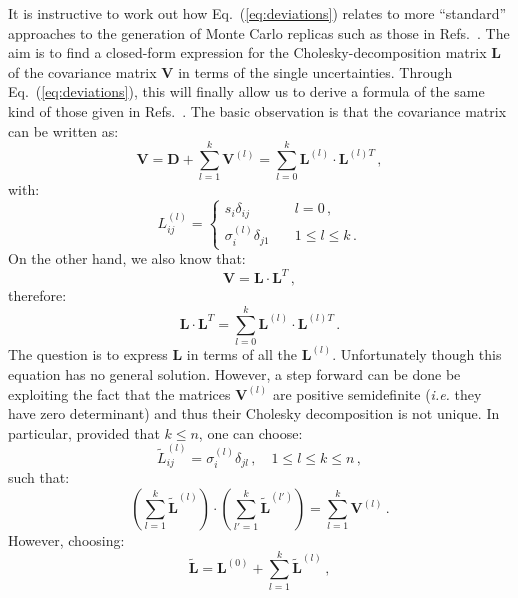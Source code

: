 \documentclass[10pt,a4paper]{article}
\begin{document}
It is instructive to work out how Eq.~(\ref{eq:deviations}) relates to
more ``standard'' approaches to the generation of Monte Carlo replicas
such as those in Refs.~\cite{Ball:2008by, Ball:2014uwa}. The aim is to
find a closed-form expression for the Cholesky-decomposition matrix
$\mathbf{L}$ of the covariance matrix $\mathbf{V}$ in terms of the
single uncertainties. Through Eq.~(\ref{eq:deviations}), this will
finally allow us to derive a formula of the same kind of those given
in Refs.~\cite{Ball:2008by, Ball:2014uwa}. The basic observation is
that the covariance matrix can be written as:
\begin{equation}
\mathbf{V} = \mathbf{D}+ \sum_{l=1}^k 
\mathbf{V}^{(l)} = \sum_{l=0}^k \mathbf{L}^{(l)}\cdot \mathbf{L}^{(l)T}\,,
\end{equation}
with:
\begin{equation}
L_{ij}^{(l)}=\left\{
\begin{array}{ll}
s_i\delta_{ij}&\quad l = 0\,,\\
\sigma_i^{(l)}\delta_{j1}&\quad 1\leq l\leq k\,.
\end{array}
\right.
\end{equation}
On the other hand, we also know that:
\begin{equation}
  \mathbf{V} = \mathbf{L}\cdot \mathbf{L}^T\,,
\end{equation}
therefore:
\begin{equation}
  \mathbf{L}\cdot \mathbf{L}^T=\sum_{l=0}^k \mathbf{L}^{(l)}\cdot \mathbf{L}^{(l)T}\,.
\end{equation}
The question is to express $\mathbf{L}$ in terms of all the
$\mathbf{L}^{(l)}$. Unfortunately though this equation has no general
solution. However, a step forward can be done be exploiting the fact
that the matrices $\mathbf{V}^{(l)}$ are positive semidefinite
(\textit{i.e.} they have zero determinant) and thus their Cholesky
decomposition is not unique. In particular, provided that $k\leq n$,
one can choose:
\begin{equation}\label{eq:choldecomp2}
\widetilde{L}_{ij}^{(l)}=
\sigma_i^{(l)}\delta_{jl}\,,\quad 1\leq l\leq k\leq n\,,
\end{equation}
such that:
\begin{equation}
  \left(\sum_{l=1}^k\widetilde{\mathbf{L}}^{(l)}\right)\cdot\left(
    \sum_{l'=1}^k\widetilde{\mathbf{L}}^{(l')}\right)=\sum_{l=1}^k 
  \mathbf{V}^{(l)}\,.
\end{equation}
However, choosing:
\begin{equation}\label{eq:CholVapprox}
\widetilde{\mathbf{L}} = \mathbf{L}^{(0)} + \sum_{l=1}^k\widetilde{\mathbf{L}}^{(l)}\,,
\end{equation}
\end{document}
